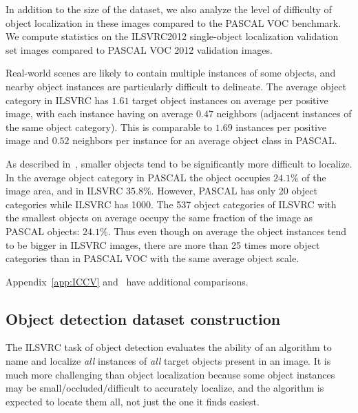\begin{table}
In addition to the size of the dataset, we also analyze the level of difficulty of object localization
in these images compared to the PASCAL VOC benchmark. We compute statistics on the ILSVRC2012 single-object localization
validation set images compared to PASCAL VOC 2012 validation images. 

Real-world scenes are likely to contain multiple instances of some objects, and nearby object instances are particularly difficult to delineate.  The average object category in ILSVRC has $1.61$ target object instances on average per positive image, with each instance having on average $0.47$ neighbors (adjacent instances of the same object category). This is comparable to $1.69$ instances per positive image and $0.52$ neighbors per instance for an average object class in PASCAL. 

As described in~\citep{Hoiem12}, smaller objects tend to be significantly more difficult to localize. In the average object category in PASCAL
the object occupies $24.1\%$ of the image area, and in ILSVRC $35.8\%$. However, PASCAL has only 20 object
categories while ILSVRC has 1000. The 537 object categories of ILSVRC with the smallest objects on average occupy the same
fraction of the image as PASCAL objects: $24.1\%$. Thus even though on average the object instances tend to be bigger in ILSVRC images,
there are more than 25 times more object categories than in PASCAL VOC with the same average object scale. 

Appendix~\ref{app:ICCV} and~\citep{Russakovsky13} have additional comparisons. 






\subsection{Object detection dataset construction}
\label{sec:AnnotDet}

The ILSVRC task of object detection evaluates the ability of an algorithm to name and localize \emph{all} instances
of \emph{all} target objects present in an image. It is much more challenging than object localization because
some object instances may be small/occluded/difficult to accurately localize, and the algorithm is expected
to locate them all, not just the one it finds easiest. 


\end{table}
